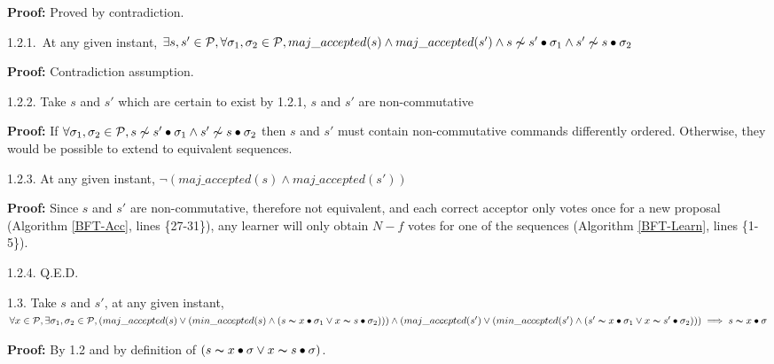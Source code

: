 \indent\indent\indent\indent\parbox{\linewidth}{\strut\textbf{Proof:} Proved by contradiction.}\par
\indent\indent\indent\indent\indent\parbox{\linewidth-\algorithmicindent*5}{\strut1.2.1.~At any given instant, $\exists s,s' \in \mathcal{P}, \forall \sigma_1,\sigma_2 \in \mathcal{P}, maj\_accepted(s) \land maj\_accepted(s') \wedge s \not\thicksim s' \bullet \sigma_1 \land s' \not\thicksim s \bullet \sigma_2$} \par
\indent\indent\indent\indent\indent\indent\parbox{\linewidth}{\strut\textbf{Proof:} Contradiction assumption.}\par
\indent\indent\indent\indent\indent\parbox{\linewidth-\algorithmicindent*5}{\strut1.2.2. Take $s$ and $s'$ which are certain to exist by 1.2.1, $s$ and $s'$ are non-commutative }\par
\indent\indent\indent\indent\indent\indent\parbox{\linewidth-\algorithmicindent*6}{\strut\textbf{Proof:} If $\forall \sigma_1,\sigma_2 \in \mathcal{P}, s \not\thicksim s' \bullet \sigma_1 \land s' \not\thicksim s \bullet \sigma_2$ then $s$ and $s'$ must contain non-commutative commands differently ordered. Otherwise, they would be possible to extend to equivalent sequences.}\par
\indent\indent\indent\indent\indent\parbox{\linewidth}{\strut1.2.3. At any given instant, $\neg (maj\_accepted(s) \land maj\_accepted(s'))$ } \par
\indent\indent\indent\indent\indent\indent\parbox{\linewidth-\algorithmicindent*6}{\strut\textbf{Proof:} Since $s$ and $s'$ are non-commutative, therefore not equivalent, and each correct acceptor only votes once for a new proposal (Algorithm \ref{BFT-Acc}, lines \{27-31\}), any learner will only obtain $N-f$ votes for one of the sequences (Algorithm \ref{BFT-Learn}, lines \{1-5\}).}\par
\indent\indent\indent\indent\indent\parbox{\linewidth}{\strut1.2.4. Q.E.D. }\par
\indent\indent\indent\parbox{\linewidth-\algorithmicindent*3}{\strut1.3. Take $s$ and $s'$, at any given instant, $\forall x \in \mathcal{P}, \exists \sigma_1,\sigma_2 \in \mathcal{P}, (maj\_accepted(s) \lor (min\_accepted(s) \land (s \thicksim x \bullet \sigma_1 \lor x \thicksim s \bullet \sigma_2))) \land (maj\_accepted(s') \lor (min\_accepted(s') \land (s' \thicksim x \bullet \sigma_1 \lor x \thicksim s' \bullet \sigma_2))) \implies s \thicksim x \bullet \sigma$}\par
\indent\indent\indent\indent\parbox{\linewidth}{\strut\textbf{Proof:} By 1.2 and by definition of $(s \thicksim x \bullet \sigma \lor x \thicksim s \bullet \sigma)$.}\par
